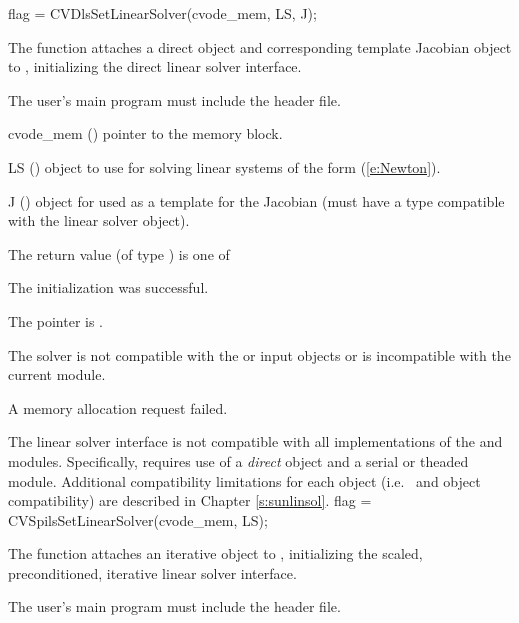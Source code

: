 {
  flag = CVDlsSetLinearSolver(cvode\_mem, LS, J);
}
{
  The function  attaches a direct
  {\sunlinsol} object  and corresponding template
  Jacobian {\sunmatrix} object  to {\cvode}, initializing the
  {\cvdls} direct linear solver interface.

  The user's main program must include the  header file.
}
{
  \begin{args}
  \item[cvode\_mem] ()
    pointer to the {\cvode} memory block.
  \item[LS] ()
    {\sunlinsol} object to use for solving linear systems of the form
    (\ref{e:Newton}).
  \item[J] ()
    {\sunmatrix} object for used as a template for the Jacobian (must
    have a type compatible with the linear solver object).
  \end{args}
}
{
  The return value  (of type ) is one of
  \begin{args}
  \item[\Id{CVDLS\_SUCCESS}]
    The {\cvdls} initialization was successful.
  \item[\Id{CVDLS\_MEM\_NULL}]
    The  pointer is .
  \item[\Id{CVDLS\_ILL\_INPUT}]
    The {\cvdls} solver is not compatible with the  or
     input objects or is incompatible with the current
    {\nvector} module.
  \item[\Id{CVDLS\_MEM\_FAIL}]
    A memory allocation request failed.
  \end{args}
}
{
  The {\cvdls} linear solver interface is not compatible with all
  implementations of the {\sunlinsol} and {\nvector}
  modules.  Specifically, {\cvdls} requires use of a \emph{direct}
  {\sunlinsol} object and a serial or theaded {\nvector}
  module. Additional compatibility limitations for each
  {\sunlinsol} object (i.e.~{\sunmatrix} and {\nvector} object
  compatibility) are described in Chapter \ref{s:sunlinsol}.
}
{
  flag = CVSpilsSetLinearSolver(cvode\_mem, LS);
}
{
  The function  attaches an iterative
  {\sunlinsol} object  to {\cvode}, initializing the
  {\cvspils} scaled, preconditioned, iterative linear solver
  interface.

  The user's main program must include the  header
  file.
}
